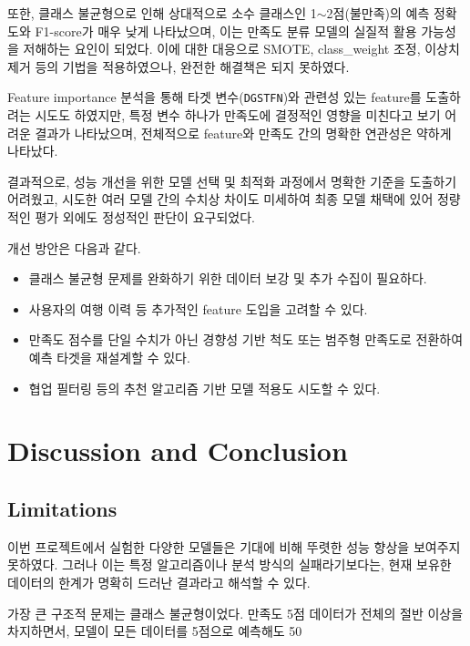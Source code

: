\documentclass[sigconf]{acmart}
\begin{document}
\begin{CJK}{UTF8}{mj}
또한, 클래스 불균형으로 인해 상대적으로 소수 클래스인 1$\sim$2점(불만족)의 예측 정확도와 F1-score가 매우 낮게 나타났으며, 이는 만족도 분류 모델의 실질적 활용 가능성을 저해하는 요인이 되었다.  
이에 대한 대응으로 SMOTE, class\_weight 조정, 이상치 제거 등의 기법을 적용하였으나, 완전한 해결책은 되지 못하였다.

Feature importance 분석을 통해 타겟 변수(\texttt{DGSTFN})와 관련성 있는 feature를 도출하려는 시도도 하였지만, 특정 변수 하나가 만족도에 결정적인 영향을 미친다고 보기 어려운 결과가 나타났으며, 전체적으로 feature와 만족도 간의 명확한 연관성은 약하게 나타났다.

결과적으로, 성능 개선을 위한 모델 선택 및 최적화 과정에서 명확한 기준을 도출하기 어려웠고, 시도한 여러 모델 간의 수치상 차이도 미세하여 최종 모델 채택에 있어 정량적인 평가 외에도 정성적인 판단이 요구되었다.

개선 방안은 다음과 같다. 
\begin{itemize}
  \item 클래스 불균형 문제를 완화하기 위한 데이터 보강 및 추가 수집이 필요하다.
  \item 사용자의 여행 이력 등 추가적인 feature 도입을 고려할 수 있다.
  \item 만족도 점수를 단일 수치가 아닌 경향성 기반 척도 또는 범주형 만족도로 전환하여 예측 타겟을 재설계할 수 있다.
  \item 협업 필터링 등의 추천 알고리즘 기반 모델 적용도 시도할 수 있다.
\end{itemize}


\section{Discussion and Conclusion}%

\subsection{Limitations}
이번 프로젝트에서 실험한 다양한 모델들은 기대에 비해 뚜렷한 성능 향상을 보여주지 못하였다. 그러나 이는 특정 알고리즘이나 분석 방식의 실패라기보다는, 현재 보유한 데이터의 한계가 명확히 드러난 결과라고 해석할 수 있다.

가장 큰 구조적 문제는 클래스 불균형이었다. 만족도 5점 데이터가 전체의 절반 이상을 차지하면서, 모델이 모든 데이터를 5점으로 예측해도 50%


\end{CJK}
\end{document}
